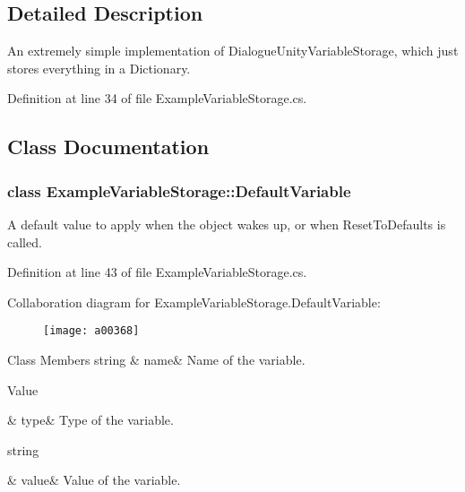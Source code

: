 \subsection{Detailed Description}
An extremely simple implementation of Dialogue\-Unity\-Variable\-Storage, which just stores everything in a Dictionary. 

Definition at line 34 of file Example\-Variable\-Storage.\-cs.



\subsection{Class Documentation}
\label{a00358}
\hypertarget{a00079_a00358}{}
\subsubsection{class Example\-Variable\-Storage\-:\-:Default\-Variable}
A default value to apply when the object wakes up, or when Reset\-To\-Defaults is called. 

Definition at line 43 of file Example\-Variable\-Storage.\-cs.



Collaboration diagram for Example\-Variable\-Storage.\-Default\-Variable\-:
\nopagebreak
\begin{figure}[H]
\begin{center}
\leavevmode
\texttt{[image: a00368]}
\end{center}
\end{figure}
\begin{DoxyFields}{Class Members}
\hypertarget{a00079_a609feaa53936e7dc42248ff2ba68454a}{string}\label{a00079_a609feaa53936e7dc42248ff2ba68454a}
&
name&
Name of the variable. \\
\hline

\hypertarget{a00079_a904347efdca12f40243c7dedb646153d}{Value}\label{a00079_a904347efdca12f40243c7dedb646153d}
&
type&
Type of the variable. \\
\hline

\hypertarget{a00079_a0f00ecb21b58aa754a4bbb61edf62818}{string}\label{a00079_a0f00ecb21b58aa754a4bbb61edf62818}
&
value&
Value of the variable. \\
\hline

\end{DoxyFields}


